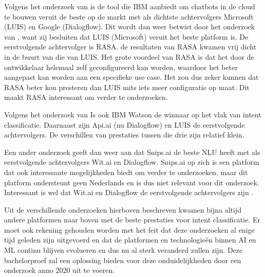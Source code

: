 Volgens het onderzoek van \textcite{Russis2018} is de tool die IBM aanbiedt om chatbots in de cloud te bouwen veruit de beste op de markt met als dichtste achtervolgers Microsoft (LUIS) en Google (Dialogflow). Dit wordt dan weer betwist door het onderzoek van \textcite{Langen2017}, want zij besluiten dat LUIS (Microsoft) veruit het beste platform is. De eerstvolgende achtervolger is RASA. de resultaten van RASA kwamen vrij dicht in de buurt van die van LUIS. Het grote voordeel van RASA is dat het door de ontwikkelaar helemaal zelf geconfigureerd kan worden, waardoor het beter aangepast kan worden aan een specifieke use case. Het zou dus zeker kunnen dat RASA beter kon presteren dan LUIS mits iets meer configuratie op maat. Dit maakt RASA interessant om verder te onderzoeken.

Volgens het onderzoek van \textcite{Savenkov2017} Is ook IBM Watson de winnaar op het vlak van intent classificatie. Daarnaast zijn Api.ai (nu Dialogflow) en LUIS de eerstvolgende achtervolgers. De verschillen van prestaties tussen die drie zijn relatief klein.

Een ander onderzoek geeft dan weer aan dat Snips.ai de beste NLU heeft met als eerstvolgende achtervolgers Wit.ai en Dialogflow. Snips.ai op zich is een platform dat ook interessante mogelijkheden biedt om verder te onderzoeken, maar dit platform ondersteunt geen Nederlands en is dus niet relevant voor dit onderzoek. Interessant is wel dat Wit.ai en Dialogflow de eerstvolgende achtervolgers zijn \autocite{Coucke2017}.

Uit de verschillende onderzoeken hierboven beschreven kwamen bijna altijd andere platformen naar boven met de beste prestaties voor intent classificatie. Er moet ook rekening gehouden worden met het feit dat deze onderzoeken al enige tijd geleden zijn uitgevoerd en dat de platformen en technologieën binnen AI en ML continu blijven evolueren en dus nu al sterk veranderd zullen zijn. Deze bachelorproef zal een oplossing bieden voor deze onduidelijkheden door een onderzoek anno 2020 uit te voeren.
















